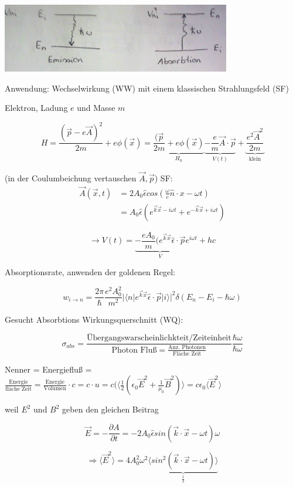 \includegraphics[width=0.75\textwidth]{kap03_09.png}

Anwendung: Wechselwirkung (WW) mit einem klassischen Strahlungsfeld (SF)

Elektron, Ladung \(e\) und Masse \(m\)

\[ H = \frac{(\vec p - e\vec A)^2}{2m}+e\phi(\vec x) =  \underbrace{\frac{(\vec p}{2m}+e\phi(\vec x)}_{H_0}\underbrace{ - \frac{e}{m}\vec A\cdot \vec p}_{V(t)}+\underbrace{\frac{e^2\vec A^2}{2m}}_{\text{klein}}\]

(in der Coulumbeichung vertauschen \(\vec A,\vec p\)) SF:
\begin{align}
  \vec A(\vec x,t) &= 2A_0 \hat \epsilon cos(\frac{\omega}{c}\hat n\cdot x -\omega t)\\
  &= A_0 \hat \epsilon (e^{\vec k\vec x-i\omega t}+e^{-\vec k\vec x+i\omega t})
\end{align}

\[\rightarrow V(t) = \underbrace{-\frac{eA_0}{m}(e^{\vec k\vec x}\hat \epsilon\cdot\vec p}_{V} e^{i\omega t} + hc\]

Absorptionsrate, anwenden der goldenen Regel:

\[ w_{i\rightarrow n} = \frac{2\pi}{\hbar} \frac{e^2 A_0^2}{m^2} |\langle n|e^{\vec k\vec x}\hat \epsilon\cdot\vec p|i\rangle |^2 \delta(E_n-E_i-\hbar\omega)\]

Gesucht Absorbtions Wirkungsquerschnitt (WQ):

\[ \sigma_{abs} = \frac{\text{Übergangswarscheinlichkteit/Zeiteinheit}}{\text{Photon Fluß} = \frac{\text{Anz. Photonen}}{\text{Fläche Zeit}}}\frac{\hbar\omega}{\hbar\omega}\]

Nenner = Energiefluß = \(\frac{\text{Energie}}{\text{fläche Zeit}} = \frac{\text{Energie}}{\text{Volumen}}\cdot c = c\cdot u= c(\langle \frac{1}{2}(\epsilon_0\vec E^2 +\frac{1}{\mu_0}\vec B^2)\rangle = c\epsilon_0\langle \vec E^2\rangle \)

weil \(E^2\) und \(B^2\) geben den gleichen Beitrag

\[ \vec E = -\frac{\partial A}{\partial t} = -2A_0\hat \epsilon sin(\vec k\cdot\vec x -\omega t)\omega\]

\[\Rightarrow \langle \vec E^2\rangle = 4A_0^2\omega^2 \underbrace{\langle sin^2(\vec k\cdot\vec x -\omega t)\rangle }_{\frac{1}{2}}\]

